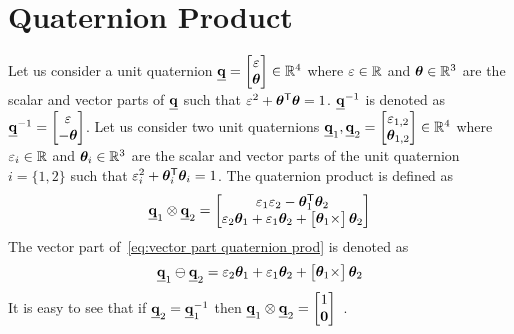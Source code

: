 \section{Quaternion Product}\label{sec-app:quaternion product}
Let us consider a unit quaternion $\mathbf{\underline{q}}= \begin{bmatrix}
\varepsilon\\ \boldsymbol{\theta}
\end{bmatrix}\in \mathbb{R}^4$ where $\varepsilon\in \mathbb{R}$  and $\boldsymbol{\theta}\in \mathbb{R}^3$ are the scalar and vector parts of $\mathbf{\underline{q}}$ such that $\varepsilon^2+\boldsymbol{\theta}^{\mathsf{T}}\boldsymbol{\theta}=1$. $\mathbf{\underline{q}}^{-1}$ is denoted as $\mathbf{\underline{q}}^{-1} = \begin{bmatrix}
\varepsilon \\ -\boldsymbol{\theta}
\end{bmatrix}$. 
Let us consider two unit quaternions $\mathbf{\underline{q}}_1,\mathbf{\underline{q}}_2= \begin{bmatrix}
\varepsilon_{1,2} \\ \boldsymbol{\theta}_{1,2}
\end{bmatrix}\in \mathbb{R}^4$ where $\varepsilon_{i}\in \mathbb{R}$  and $\boldsymbol{\theta}_{i}\in \mathbb{R}^3$ are the scalar and vector parts of the unit quaternion $i=\{1,2\}$ such that $\varepsilon_{i}^2+\boldsymbol{\theta}_{i}^{\mathsf{T}}\boldsymbol{\theta}_{i}=1$. 
The quaternion product is defined as 
\begin{equation}\label{eq:vector part quaternion prod}
\mathbf{\underline{q}}_1\otimes\mathbf{\underline{q}}_2 = \begin{bmatrix}
	\varepsilon_{1}\varepsilon_{2} - \boldsymbol{\theta}_1^{\mathsf{T}}\boldsymbol{\theta}_{2}\\ \varepsilon_{2}\boldsymbol{\theta}_{1} + \varepsilon_{1}\boldsymbol{\theta}_{2} + \begin{bmatrix} \boldsymbol{\theta}_1\times \end{bmatrix}\boldsymbol{\theta}_2
\end{bmatrix}
\end{equation}
The vector part of~\cref{eq:vector part quaternion prod} is denoted as 
\begin{equation}
\mathbf{\underline{q}}_1\ominus\mathbf{\underline{q}}_2 = \varepsilon_{2}\boldsymbol{\theta}_{1} + \varepsilon_{1}\boldsymbol{\theta}_{2} + \begin{bmatrix} \boldsymbol{\theta}_1\times \end{bmatrix}\boldsymbol{\theta}_2
\end{equation} 
It is easy to see that if $\mathbf{\underline{q}}_2=\mathbf{\underline{q}}_1^{-1}$ then $\mathbf{\underline{q}}_1\otimes\mathbf{\underline{q}}_2=\begin{bmatrix}
1 \\ \bm{0}
\end{bmatrix}$~\cite{siciliano2010robotics}.